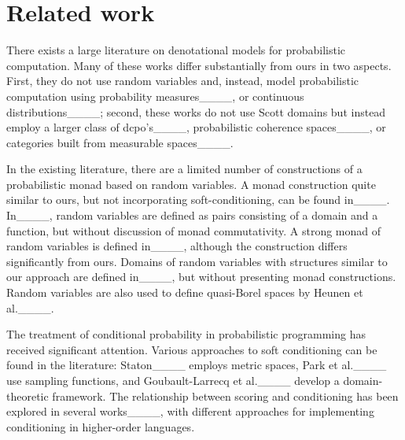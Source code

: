 \section{Related work}
There exists a large literature on denotational models for probabilistic computation. Many of these works differ substantially from ours in two aspects. First, they do not use random variables and, instead, model probabilistic computation using probability measures____, or continuous distributions____; second, these works do not use Scott domains but instead employ a larger class of dcpo's____, probabilistic coherence spaces____, or categories built from measurable spaces____.  

In the existing literature, there are a limited number of constructions of a probabilistic monad based on random variables. A monad construction quite similar to ours, but not incorporating soft-conditioning, can be found in____. In____, random variables are defined as pairs consisting of a domain and a function, but without discussion of monad commutativity. A strong monad of random variables is defined in____, although the construction differs significantly from ours. Domains of random variables with structures similar to our approach are defined in____, but without presenting monad constructions. Random variables are also used to define quasi-Borel spaces by Heunen et al.____.

The treatment of conditional probability in probabilistic programming has received significant attention. Various approaches to soft conditioning can be found in the literature: Staton____ employs metric spaces, Park et al.____ use sampling functions, and Goubault-Larrecq et al.____ develop a domain-theoretic framework. The relationship between scoring and conditioning has been explored in several works____, with different approaches for implementing conditioning in higher-order languages.